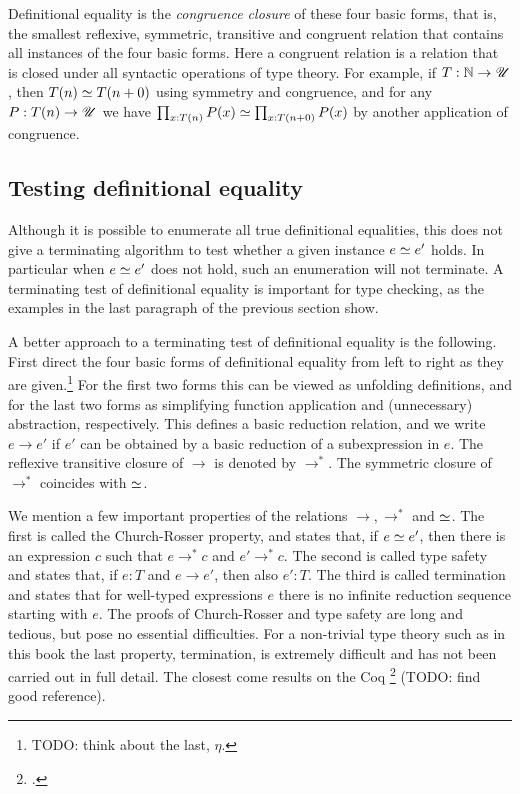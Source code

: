 Definitional equality is the \emph{congruence closure} of these 
four basic forms, that is, the smallest reflexive, symmetric, transitive
and congruent relation that contains all instances of the four basic forms.
Here a congruent relation is a relation that is closed under all syntactic
operations of type theory. For example, if $T : \mathbb{N}\to{\mathscr{U}}$, then $T(n)\jdeq T(n+0)$
using symmetry and congruence, and for any $P: T(n)\to{\mathscr{U}}$ we have
$\prod_{x:T(n)} P(x) \jdeq \prod_{x:T(n+0)} P(x)$ by another application
of congruence.


\subsection{Testing definitional equality}
\label{sec:defeq-computation}

Although it is possible to enumerate all true definitional equalities,
this does not give a terminating algorithm to test whether a given instance $e\jdeq e'$ holds.
In particular when $e\jdeq e'$ does not hold, such an enumeration will not terminate.
A terminating test of definitional equality is important for type checking,
as the examples in the last paragraph of the previous section show.

A better approach to a terminating test of definitional equality is the following.
First direct the four basic forms of definitional equality from left to right
as they are given.\footnote{%
TODO: think about the last, $\eta$.}
For the first two forms this can be viewed as unfolding definitions,
and for the last two forms as simplifying function application and (unnecessary) 
abstraction, respectively.
This defines a basic reduction relation, and we write $e\to e'$ if $e'$ can
be obtained by a basic reduction of a subexpression in $e$. 
The reflexive transitive closure of $\to$ is denoted by $\to^*$.
The symmetric closure of $\to^*$ coincides with $\jdeq$.

We mention a few important properties of the relations $\to,\to^*$ and $\jdeq$.
The first is called the Church-Rosser property, and states that,
if $e\jdeq e'$, then there is an expression $c$ such that $e\to^* c$
and $e'\to^* c$. The second is called type safety and states that,
if $e:T$ and $e\to e'$, then also $e':T$.
The third is called termination and states that for well-typed expressions $e$
there is no infinite reduction sequence starting with $e$.
The proofs of Church-Rosser and type safety are long and tedious, but pose no essential
difficulties. For a non-trivial type theory such as in this book the last property,
termination, is extremely difficult and has not been carried out in full detail.
The closest come results on the Coq \footcite{Coq} (TODO: find good reference).

